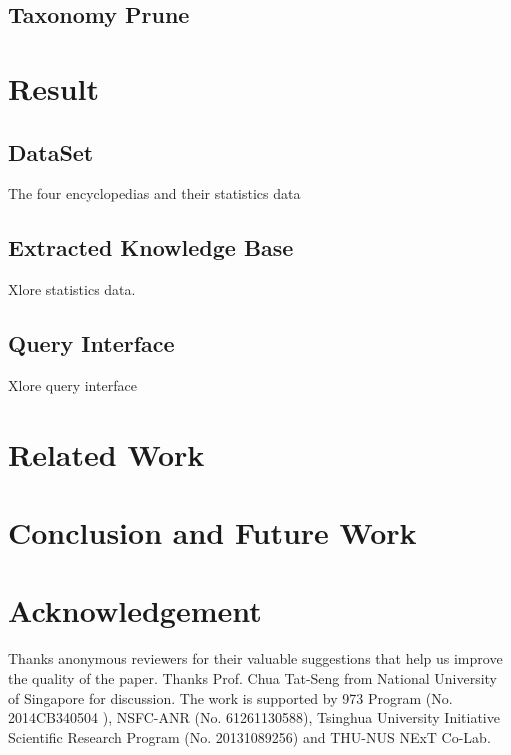 \documentclass[runningheads,a4paper]{llncs}
\begin{document}
\subsection{Taxonomy Prune}


\section{Result}
\label{sec:result}
\subsection{DataSet}
The four encyclopedias and their statistics data
\subsection{Extracted Knowledge Base}
Xlore statistics data.
\subsection{Query Interface}
Xlore query interface 

\section{Related Work}
\label{sec:work}

\section{Conclusion and Future Work}
\label{sec:con}

\section*{Acknowledgement}
Thanks anonymous reviewers for their valuable suggestions that help us improve the quality of the paper. Thanks Prof. Chua Tat-Seng from National University of Singapore for discussion. The work is supported by 973 Program (No. 2014CB340504 ), NSFC-ANR (No. 61261130588), Tsinghua University Initiative Scientific Research Program (No. 20131089256) and THU-NUS NExT Co-Lab.



\end{document}
